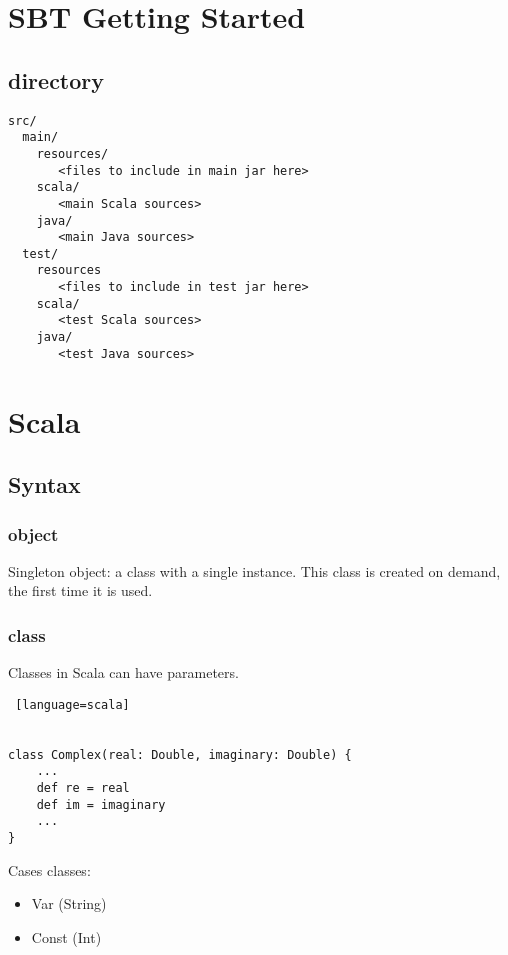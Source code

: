 \documentclass[12pt]{article}
\begin{document}
\maketitle

\section{SBT Getting Started}
\subsection{directory}

\begin{lstlisting}
src/
  main/
    resources/
       <files to include in main jar here>
    scala/
       <main Scala sources>
    java/
       <main Java sources>
  test/
    resources
       <files to include in test jar here>
    scala/
       <test Scala sources>
    java/
       <test Java sources>
\end{lstlisting}


\section{Scala}

\subsection{Syntax}
\subsubsection{object}
Singleton object: a class with a single instance. This class is created on demand, the first time it is used.

\subsubsection{class}
Classes in Scala can have parameters.

\begin{lstlisting} [language=scala]


class Complex(real: Double, imaginary: Double) {
	...
	def re = real	
	def im = imaginary
	...
}

\end{lstlisting}

Cases classes:
\begin{itemize}
\item Var (String)
\item Const (Int)
\end{itemize}
\end{document}
